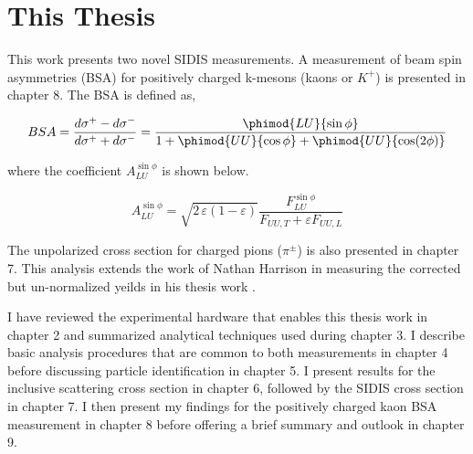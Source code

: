 \section{This Thesis}
This work presents two novel SIDIS measurements.  A measurement of beam spin asymmetries (BSA) for positively charged k-mesons (kaons or $K^+$) is presented in chapter 8.  The BSA is defined as, 

\begin{equation}
  BSA = \frac{d\sigma^+ - d\sigma^-}{d\sigma^+ + d\sigma^-} = \frac{\phimod{LU}{\sin\phi}}{1 + \phimod{UU}{\cos\phi} + \phimod{UU}{\cos(2\phi)}}
\end{equation}

where the coefficient $A_{LU}^{\sin\phi}$ is shown below.

\begin{equation}
  A_{LU}^{\sin\phi} = \sqrt{2\,\varepsilon (1-\varepsilon)} \frac{F_{LU}^{\sin\phi}}{F_{UU,T} + \varepsilon F_{UU,L}}
\end{equation}

The unpolarized cross section for charged pions ($\pi^{\pm}$) is also presented in chapter 7.  This analysis extends the work of Nathan Harrison in measuring the corrected but un-normalized yeilds in his thesis work \cite{theses-harrison:2015}.


I have reviewed the experimental hardware that enables this thesis work in chapter 2 and summarized analytical techniques used during chapter 3.  I describe basic analysis procedures that are common to both measurements in chapter 4 before discussing particle identification in chapter 5.  I present results for the inclusive scattering cross section in chapter 6, followed by the SIDIS cross section in chapter 7.  I then present my findings for the positively charged kaon BSA measurement in chapter 8 before offering a brief summary and outlook in chapter 9. 

